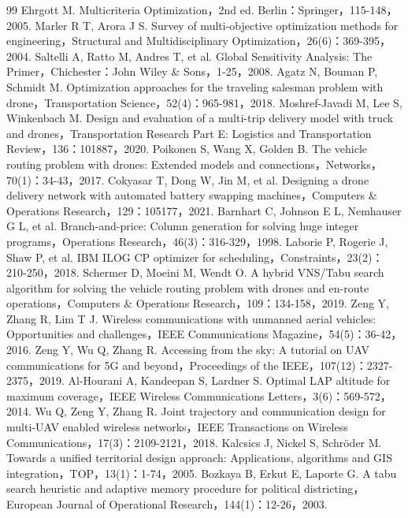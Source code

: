 \documentclass[withoutpreface,bwprint]{format}
\begin{document}
\begin{thebibliography}{99}
 Ehrgott M. Multicriteria Optimization，2nd ed. Berlin：Springer，115-148，2005.
 Marler R T, Arora J S. Survey of multi-objective optimization methods for engineering，Structural and Multidisciplinary Optimization，26(6)：369-395，2004.
 Saltelli A, Ratto M, Andres T, et al. Global Sensitivity Analysis: The Primer，Chichester：John Wiley \& Sons，1-25，2008.
 Agatz N, Bouman P, Schmidt M. Optimization approaches for the traveling salesman problem with drone，Transportation Science，52(4)：965-981，2018.
 Moshref-Javadi M, Lee S, Winkenbach M. Design and evaluation of a multi-trip delivery model with truck and drones，Transportation Research Part E: Logistics and Transportation Review，136：101887，2020.
 Poikonen S, Wang X, Golden B. The vehicle routing problem with drones: Extended models and connections，Networks，70(1)：34-43，2017.
 Cokyasar T, Dong W, Jin M, et al. Designing a drone delivery network with automated battery swapping machines，Computers \& Operations Research，129：105177，2021.
 Barnhart C, Johnson E L, Nemhauser G L, et al. Branch-and-price: Column generation for solving huge integer programs，Operations Research，46(3)：316-329，1998.
 Laborie P, Rogerie J, Shaw P, et al. IBM ILOG CP optimizer for scheduling，Constraints，23(2)：210-250，2018.
 Schermer D, Moeini M, Wendt O. A hybrid VNS/Tabu search algorithm for solving the vehicle routing problem with drones and en-route operations，Computers \& Operations Research，109：134-158，2019.
 Zeng Y, Zhang R, Lim T J. Wireless communications with unmanned aerial vehicles: Opportunities and challenges，IEEE Communications Magazine，54(5)：36-42，2016.
 Zeng Y, Wu Q, Zhang R. Accessing from the sky: A tutorial on UAV communications for 5G and beyond，Proceedings of the IEEE，107(12)：2327-2375，2019.
 Al-Hourani A, Kandeepan S, Lardner S. Optimal LAP altitude for maximum coverage，IEEE Wireless Communications Letters，3(6)：569-572，2014.
 Wu Q, Zeng Y, Zhang R. Joint trajectory and communication design for multi-UAV enabled wireless networks，IEEE Transactions on Wireless Communications，17(3)：2109-2121，2018.
 Kalcsics J, Nickel S, Schr\"oder M. Towards a unified territorial design approach: Applications, algorithms and GIS integration，TOP，13(1)：1-74，2005.
 Bozkaya B, Erkut E, Laporte G. A tabu search heuristic and adaptive memory procedure for political districting，European Journal of Operational Research，144(1)：12-26，2003.
\end{thebibliography}
\end{document}
